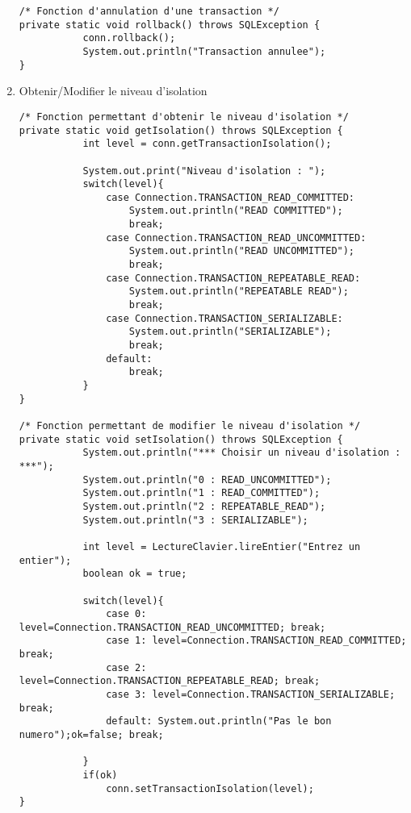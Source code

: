 \documentclass{article}
\begin{document}
\begin{enumerate}[label=\arabic*)]
\begin{lstlisting}
/* Fonction d'annulation d'une transaction */
private static void rollback() throws SQLException {
           conn.rollback();
           System.out.println("Transaction annulee");
}
	\end{lstlisting}

	\item Obtenir/Modifier le niveau d'isolation

	\begin{lstlisting}
/* Fonction permettant d'obtenir le niveau d'isolation */
private static void getIsolation() throws SQLException {
           int level = conn.getTransactionIsolation();
            
           System.out.print("Niveau d'isolation : ");
           switch(level){
               case Connection.TRANSACTION_READ_COMMITTED:
                   System.out.println("READ COMMITTED");
                   break;
               case Connection.TRANSACTION_READ_UNCOMMITTED:
                   System.out.println("READ UNCOMMITTED");
                   break;
               case Connection.TRANSACTION_REPEATABLE_READ:
                   System.out.println("REPEATABLE READ");
                   break;
               case Connection.TRANSACTION_SERIALIZABLE:
                   System.out.println("SERIALIZABLE");
                   break;
               default:
                   break;
           }
}

/* Fonction permettant de modifier le niveau d'isolation */
private static void setIsolation() throws SQLException {
           System.out.println("*** Choisir un niveau d'isolation : ***");
           System.out.println("0 : READ_UNCOMMITTED");
           System.out.println("1 : READ_COMMITTED");
           System.out.println("2 : REPEATABLE_READ");
           System.out.println("3 : SERIALIZABLE");
                  
           int level = LectureClavier.lireEntier("Entrez un entier");
           boolean ok = true;
            
           switch(level){
               case 0: level=Connection.TRANSACTION_READ_UNCOMMITTED; break;
               case 1: level=Connection.TRANSACTION_READ_COMMITTED; break;
               case 2: level=Connection.TRANSACTION_REPEATABLE_READ; break;
               case 3: level=Connection.TRANSACTION_SERIALIZABLE; break;
               default: System.out.println("Pas le bon numero");ok=false; break;
               
           }
           if(ok)
               conn.setTransactionIsolation(level);
}
	\end{lstlisting}	

\end{enumerate}
\end{document}

